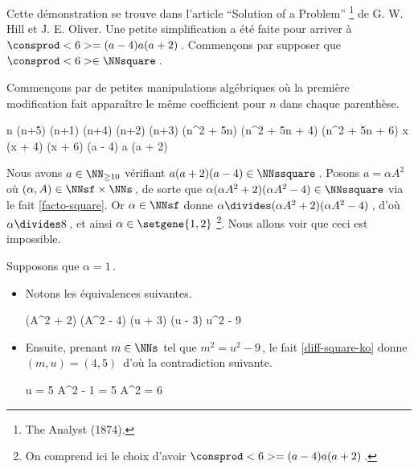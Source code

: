Cette démonstration se trouve dans l'article \enquote{Solution of a Problem}
\footnote{
	The Analyst (1874).
}
de G. W. Hill et J. E. Oliver.
Une petite simplification a été faite pour arriver à $\consprod<6> = (a - 4) a (a + 2)$\,.
Commençons par supposer que $\consprod<6> \in \NNsquare$\,.

\smallskip

Commençons par de petites manipulations algébriques où la première modification fait apparaître le même coefficient pour $n$ dans chaque parenthèse.

\medskip
\begin{stepcalc}[style = sar]
\explnext{}
	n (n+5) \cdot (n+1) (n+4) \cdot (n+2) (n+3)
\explnext{}
	(n^2 + 5n) (n^2 + 5n + 4) (n^2 + 5n + 6)
	x (x + 4) (x + 6)
	(a - 4) a (a + 2)
\end{stepcalc}

\medskip
Nous avons $a \in \NN_{\geq 10}$ vérifiant $a (a + 2) (a - 4) \in \NNssquare$\,. 
Posons $a = \alpha A^2$ où $(\alpha, A) \in \NNsf \times \NNs$\,,
de sorte que $\alpha (\alpha A^2 + 2) (\alpha A^2 - 4) \in \NNssquare$ via le fait \ref{facto-square}.
Or $\alpha\in \NNsf$ donne $\alpha \divides (\alpha A^2 + 2) (\alpha A^2 - 4)$\,, 
d'où $\alpha \divides 8$\,, et ainsi $\alpha \in \setgene{1, 2}$
\footnote{
	On comprend ici le choix d'avoir $\consprod<6> = (a - 4) a (a + 2)$\,.
}.
Nous allons voir que ceci est impossible.

\medskip

Supposons que $\alpha = 1$\,.
%
\begin{itemize}
	\item Notons les équivalences suivantes.
    
    \noindent\kern-6pt%
    \begin{stepcalc}[style=ar*, ope=\iff]
    	(A^2 + 2) (A^2 - 4) \in \NNssquare
    	(u + 3) (u - 3) \in \NNssquare
	\explnext{}
    	u^2 - 9 \in \NNssquare
    \end{stepcalc}

	\item Ensuite, prenant $m \in \NNs$ tel que $m^2 = u^2 - 9$\,, le fait \ref{diff-square-ko} donne $(m, u) = (4, 5)$\, d'où la contradiction suivante.
    
    \noindent\kern-6pt%
    \begin{stepcalc}[style=sar, ope=\iff]
    	u = 5
	\explnext{}
    	A^2 - 1 = 5
    	A^2 = 6
    \end{stepcalc}
\end{itemize}

